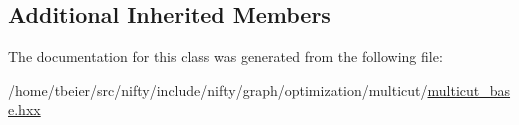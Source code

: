 \subsection*{Additional Inherited Members}


The documentation for this class was generated from the following file\+:\begin{DoxyCompactItemize}
\item 
/home/tbeier/src/nifty/include/nifty/graph/optimization/multicut/\hyperlink{multicut__base_8hxx}{multicut\+\_\+base.\+hxx}\end{DoxyCompactItemize}
